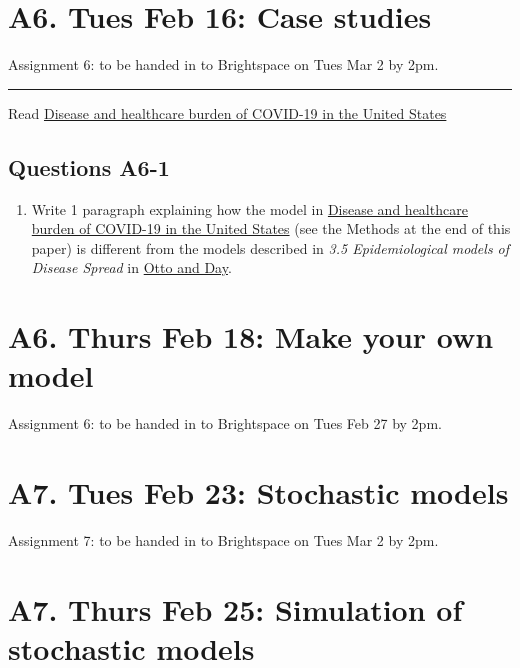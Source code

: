 \documentclass[]{book}
\providecommand{\tightlist}{%
  \setlength{\itemsep}{0pt}\setlength{\parskip}{0pt}}
\begin{document}
\chapter{A6. Tues Feb 16: Case
studies}\label{a6.-tues-feb-16-case-studies}

Assignment 6: to be handed in to Brightspace on Tues Mar 2 by 2pm.

\begin{center}\rule{0.5\linewidth}{0.5pt}\end{center}

Read
\href{https://www-nature-com.qe2a-proxy.mun.ca/articles/s41591-020-0952-y}{Disease
and healthcare burden of COVID-19 in the United States}

\section*{Questions A6-1}\label{questions-a6-1}

\begin{enumerate}
\def\labelenumi{\arabic{enumi}.}
\tightlist
\item
  Write 1 paragraph explaining how the model in
  \href{https://www-nature-com.qe2a-proxy.mun.ca/articles/s41591-020-0952-y}{Disease
  and healthcare burden of COVID-19 in the United States} (see the
  Methods at the end of this paper) is different from the models
  described in \emph{3.5 Epidemiological models of Disease Spread} in
  \href{https://ebookcentral-proquest-com.qe2a-proxy.mun.ca/lib/mun/reader.action?docID=768551\&ppg=93}{Otto
  and Day}.
\end{enumerate}

\chapter{A6. Thurs Feb 18: Make your own
model}\label{a6.-thurs-feb-18-make-your-own-model}

Assignment 6: to be handed in to Brightspace on Tues Feb 27 by 2pm.

\chapter{A7. Tues Feb 23: Stochastic
models}\label{a7.-tues-feb-23-stochastic-models}

Assignment 7: to be handed in to Brightspace on Tues Mar 2 by 2pm.

\chapter{A7. Thurs Feb 25: Simulation of stochastic
models}\label{a7.-thurs-feb-25-simulation-of-stochastic-models}
\end{document}
